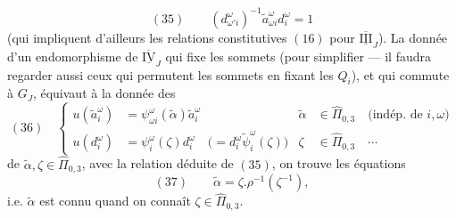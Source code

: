 \[
(35)\qquad(d_{\omega'i}^\omega)^{-1}\widetilde a_{\omega i}^{\omega}d_i^\omega=1
\]
(qui impliquent d'ailleurs les relations constitutives $(16)$ pour $\overline{\underline{\mathrm{III}}}_J$). La donnée d'un endomorphisme de $\overline{\underline{\mathrm{IV}}}_J$ qui fixe les  sommets (pour simplifier --- il faudra regarder aussi ceux qui permutent les sommets  en fixant les $Q_i$),  et qui commute à $G_J$, équivaut à la donnée des
\[
(36)\quad\left\{\begin{aligned}
u(\widetilde a_i^\omega)&=\psi_{\omega i}^\omega(\widetilde\alpha)\widetilde a_i^\omega
&\widetilde\alpha&\in\widehat\Pi_{0,3}\quad\text{(indép. de }i,\omega\text{)}\\
u(d_i^\omega)&=\psi_i^\omega(\zeta)d_i^\omega\quad\bigl(=d_i^\omega\widetilde\psi_i^\omega(\zeta)\bigr)
&\zeta&\in\widehat\Pi_{0,3}\quad\cdots
\end{aligned}\right.
\]
de $\widetilde\alpha,\zeta\in\widehat\Pi_{0,3}$, avec la relation déduite de $(35)$, on trouve les équations
\[
(37)\qquad\widetilde\alpha=\zeta.\rho^{-1}(\zeta^{-1}),
\]
i.e. $\widetilde\alpha$ est connu quand on connaît $\zeta\in\widehat\Pi_{0,3}$.
